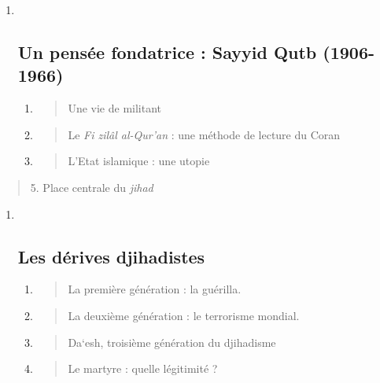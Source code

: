 \begin{enumerate}
\def\labelenumi{\Roman{enumi}.}
\item ~
  \hypertarget{un-pensuxe9e-fondatrice-sayyid-qutb-1906-1966}{%
  \subsection{\texorpdfstring{{Un pensée fondatrice : Sayyid
  Qutb
  (1906-1966)}}{Un pensée fondatrice : Sayyid Qutb (1906-1966)}}\label{un-pensuxe9e-fondatrice-sayyid-qutb-1906-1966}}

  \begin{enumerate}
  \def\labelenumii{\arabic{enumii}.}
  \item
    \begin{quote}
    Une vie de militant
    \end{quote}
  \item
    \begin{quote}
    Le \emph{Fi zilâl al-Qur'an} : une méthode de lecture du Coran
    \end{quote}
  \item
    \begin{quote}
    L'Etat islamique : une utopie
    \end{quote}
  \end{enumerate}
\end{enumerate}

\begin{quote}
5. Place centrale du \emph{jihad}
\end{quote}

\begin{enumerate}
\def\labelenumi{\Roman{enumi}.}
\setcounter{enumi}{1}
\item ~
  \hypertarget{les-duxe9rives-djihadistes}{%
  \subsection{\texorpdfstring{{Les dérives
  djihadistes}}{Les dérives djihadistes}}\label{les-duxe9rives-djihadistes}}

  \begin{enumerate}
  \def\labelenumii{\arabic{enumii}.}
  \item
    \begin{quote}
    La première génération : la guérilla.
    \end{quote}
  \item
    \begin{quote}
    La deuxième génération : le terrorisme mondial.
    \end{quote}
  \item
    \begin{quote}
    Da`esh, troisième génération du djihadisme
    \end{quote}
  \item
    \begin{quote}
    Le martyre : quelle légitimité ?
    \end{quote}
  \end{enumerate}
\end{enumerate}

